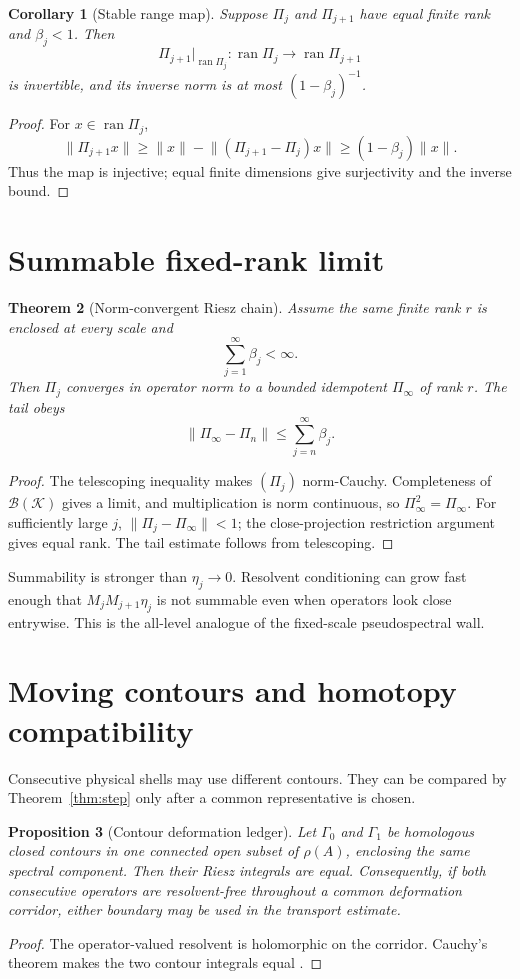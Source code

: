 \documentclass[12pt]{article}
\newtheorem{theorem}{Theorem}
\newtheorem{proposition}[theorem]{Proposition}
\newtheorem{corollary}[theorem]{Corollary}
\newcommand{\norm}[1]{\lVert#1\rVert}
\begin{document}
\begin{corollary}[Stable range map]\label{cor:range}
Suppose $\Pi_j$ and $\Pi_{j+1}$ have equal finite rank and $\beta_j<1$.
Then
\[
 \Pi_{j+1}|_{\operatorname{ran}\Pi_j}:
 \operatorname{ran}\Pi_j\longrightarrow\operatorname{ran}\Pi_{j+1}
\]
is invertible, and its inverse norm is at most $(1-\beta_j)^{-1}$.
\end{corollary}
\begin{proof}
For $x\in\operatorname{ran}\Pi_j$,
\[
 \norm{\Pi_{j+1}x}\ge
 \norm x-\norm{(\Pi_{j+1}-\Pi_j)x}
 \ge(1-\beta_j)\norm x.
\]
Thus the map is injective; equal finite dimensions give surjectivity and the
inverse bound.
\end{proof}

\section{Summable fixed-rank limit}
\begin{theorem}[Norm-convergent Riesz chain]\label{thm:sum}
Assume the same finite rank $r$ is enclosed at every scale and
\[
 \sum_{j=1}^{\infty}\beta_j<\infty.
\]
Then $\Pi_j$ converges in operator norm to a bounded idempotent $\Pi_\infty$
of rank $r$.  The tail obeys
\[
 \norm{\Pi_\infty-\Pi_n}\le\sum_{j=n}^{\infty}\beta_j.
\]
\end{theorem}
\begin{proof}
The telescoping inequality makes $(\Pi_j)$ norm-Cauchy.  Completeness of
$\mathcal B(\mathcal K)$ gives a limit, and multiplication is norm
continuous, so $\Pi_\infty^2=\Pi_\infty$.  For sufficiently large $j$,
$\norm{\Pi_j-\Pi_\infty}<1$; the close-projection restriction argument gives
equal rank.  The tail estimate follows from telescoping.
\end{proof}

Summability is stronger than $\eta_j\to0$.  Resolvent conditioning can grow
fast enough that $M_jM_{j+1}\eta_j$ is not summable even when operators look
close entrywise.  This is the all-level analogue of the fixed-scale
pseudospectral wall.

\section{Moving contours and homotopy compatibility}
Consecutive physical shells may use different contours.  They can be
compared by Theorem~\ref{thm:step} only after a common representative is
chosen.

\begin{proposition}[Contour deformation ledger]
Let $\Gamma_0$ and $\Gamma_1$ be homologous closed contours in one connected
open subset of $\rho(A)$, enclosing the same spectral component.  Then their
Riesz integrals are equal.  Consequently, if both consecutive operators are
resolvent-free throughout a common deformation corridor, either boundary may
be used in the transport estimate.
\end{proposition}
\begin{proof}
The operator-valued resolvent is holomorphic on the corridor.  Cauchy's
theorem makes the two contour integrals equal \citep{Kato1995}.
\end{proof}
\end{document}
